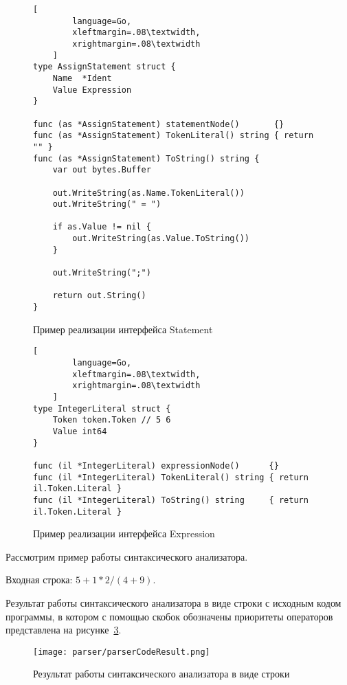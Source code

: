 \begin{figure}[!htb]
	\centering
	\vspace{\toppaddingoffigure}
	\begin{lstlisting}[
        language=Go,
        xleftmargin=.08\textwidth,
        xrightmargin=.08\textwidth
    ]
type AssignStatement struct {
    Name  *Ident
    Value Expression
}

func (as *AssignStatement) statementNode()       {}
func (as *AssignStatement) TokenLiteral() string { return "" }
func (as *AssignStatement) ToString() string {
    var out bytes.Buffer

    out.WriteString(as.Name.TokenLiteral())
    out.WriteString(" = ")

    if as.Value != nil {
        out.WriteString(as.Value.ToString())
    }

    out.WriteString(";")

    return out.String()
}
\end{lstlisting}
	\caption{Пример реализации интерфейса Statement}
	\label{f:code_IStatementExample}
\end{figure}

\begin{figure}[!htb]
	\centering
	\vspace{\toppaddingoffigure}
	\begin{lstlisting}[
        language=Go,
        xleftmargin=.08\textwidth,
        xrightmargin=.08\textwidth
    ]
type IntegerLiteral struct {
    Token token.Token // 5 6
    Value int64
}

func (il *IntegerLiteral) expressionNode()      {}
func (il *IntegerLiteral) TokenLiteral() string { return il.Token.Literal }
func (il *IntegerLiteral) ToString() string     { return il.Token.Literal }
\end{lstlisting}
	\caption{Пример реализации интерфейса Expression}
	\label{f:code_IExpressionExample}
\end{figure}

Рассмотрим пример работы синтаксического анализатора.

Входная строка: $5 + 1 * 2 / (4 + 9)$.

Результат работы синтаксического анализатора в виде строки с исходным кодом программы,
в котором с помощью скобок обозначены приоритеты операторов представлена на рисунке~\ref{f:parserCodeResult}.

\begin{figure}[ht]
	\centering
	\vspace{\toppaddingoffigure}
	\texttt{[image: parser/parserCodeResult.png]}
	\caption{Результат работы синтаксического анализатора в виде строки}
	\label{f:parserCodeResult}
\end{figure}


